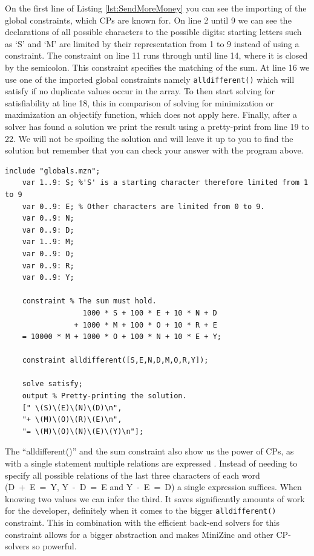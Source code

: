 \label{sendMoreMoneyExplanation}
On the first line of Listing \ref{lst:SendMoreMoney} you can see the importing of the global constraints, which CPs are known for. On line 2 until 9 we can see the declarations of all possible characters to the possible digits: starting letters such as ‘S’ and ‘M’ are limited by their representation from 1 to 9 instead of using a constraint. The constraint on line 11 runs through until line 14, where it is closed by the semicolon. This constraint specifies the matching of the sum. At line 16 we use one of the imported global constraints namely \texttt{alldifferent()} which will satisfy if no duplicate values occur in the array. To then start solving for satisfiability at line 18, this in comparison of solving for minimization or maximization an objectify function, which does not apply here. Finally, after a solver has found a solution we print the result using a pretty-print from line 19 to 22.
We will not be spoiling the solution and will leave it up to you to find the solution but remember that you can check your answer with the program above.

\begin{minipage}{0.948\textwidth}
\begin{lstlisting}[language=minizinc, label={lst:SendMoreMoney}, caption={Solution to the puzzle “send more money” modified and taken from \url{https://www.minizinc.org/doc-2.5.5/en/downloads/send-more-money.mzn}.}]
	include "globals.mzn";
	var 1..9: S; %'S' is a starting character therefore limited from 1 to 9
	var 0..9: E; % Other characters are limited from 0 to 9.
	var 0..9: N;
	var 0..9: D;
	var 1..9: M;
	var 0..9: O;
	var 0..9: R;
	var 0..9: Y;
	
	constraint % The sum must hold.
                  1000 * S + 100 * E + 10 * N + D
                + 1000 * M + 100 * O + 10 * R + E
    = 10000 * M + 1000 * O + 100 * N + 10 * E + Y;
	
	constraint alldifferent([S,E,N,D,M,O,R,Y]);
	
	solve satisfy;
	output % Pretty-printing the solution.
	[" \(S)\(E)\(N)\(D)\n",
	"+ \(M)\(O)\(R)\(E)\n",
	"= \(M)\(O)\(N)\(E)\(Y)\n"];
\end{lstlisting}
\end{minipage}


The “alldifferent()” and the sum constraint also show us the power of CPs, as with a single statement multiple relations are expressed \cite{53marriott1998programming}. Instead of needing to specify all possible relations of the last three characters of each word (\mbox{D + E = Y}, \mbox{Y - D = E} and \mbox{Y - E = D}) a single expression suffices. When knowing two values we can infer the third. It saves significantly amounts of work for the developer, definitely when it comes to the bigger \texttt{alldifferent()} constraint. This in combination with the efficient back-end solvers for this constraint allows for a bigger abstraction and makes MiniZinc and other CP-solvers so powerful.

